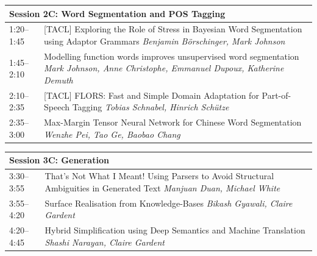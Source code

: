 \documentclass{book}
\renewcommand{\large}{\fontsize{36}{40}\selectfont}
\begin{document}
\begin{tabular}{p{3in}p{16in}}
  \multicolumn{2}{l}{\bfseries\large Session 2C: Word Segmentation and POS Tagging} \\\hline

    
    1:20--1:45
    &	[TACL] Exploring the Role of Stress in Bayesian Word Segmentation using Adaptor Grammars \newline 
    {\itshape Benjamin Börschinger, Mark Johnson} \\
    
    1:45--2:10
    &	Modelling function words improves unsupervised word segmentation \newline 
    {\itshape Mark Johnson, Anne Christophe, Emmanuel Dupoux, Katherine Demuth} \\
    
    2:10--2:35
    &	[TACL] FLORS: Fast and Simple Domain Adaptation for Part-of-Speech Tagging \newline 
    {\itshape Tobias Schnabel, Hinrich Schütze} \\
    
    2:35--3:00
    &	Max-Margin Tensor Neural Network for Chinese Word Segmentation \newline 
    {\itshape Wenzhe Pei, Tao Ge, Baobao Chang} \\
    
\end{tabular}

\begin{tabular}{p{3in}p{16in}}
  \multicolumn{2}{l}{\bfseries\large Session 3C: Generation} \\\hline

    
    3:30--3:55
    &	That's Not What I Meant! Using Parsers to Avoid Structural Ambiguities in Generated Text \newline 
    {\itshape Manjuan Duan, Michael White} \\
    
    3:55--4:20
    &	Surface Realisation from Knowledge-Bases \newline 
    {\itshape Bikash Gyawali, Claire Gardent} \\
    
    4:20--4:45
    &	Hybrid Simplification using Deep Semantics and Machine Translation \newline 
    {\itshape Shashi Narayan, Claire Gardent} \\
    
\end{tabular}
\end{document}
